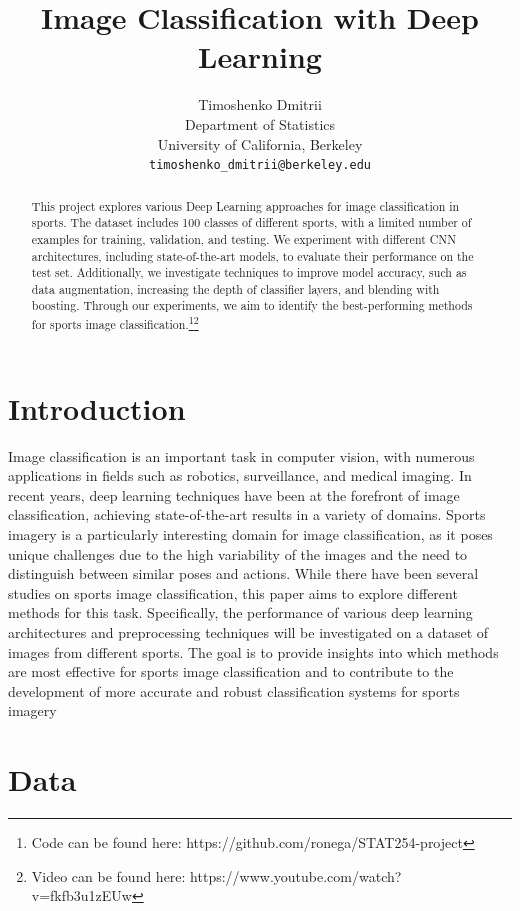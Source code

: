 \documentclass[reqno]{article}
\title{Image Classification with Deep Learning}
\author{
	Timoshenko Dmitrii\\
	Department of Statistics\\
	University of California, Berkeley\\
	\texttt{timoshenko\_dmitrii@berkeley.edu} \\
}
\begin{document}
	
	\maketitle
	
	\begin{abstract}
				This project explores various Deep Learning approaches for image classification in sports. The dataset includes 100 classes of different sports, with a limited number of examples for training, validation, and testing. We experiment with different CNN architectures, including state-of-the-art models, to evaluate their performance on the test set. Additionally, we investigate techniques to improve model accuracy, such as data augmentation, increasing the depth of classifier layers, and blending with boosting. Through our experiments, we aim to identify the best-performing methods for sports image classification.\footnote{Code can be found here: https://github.com/ronega/STAT254-project}\footnote{Video can be found here: https://www.youtube.com/watch?v=fkfb3u1zEUw}
	\end{abstract}
	
	\section{Introduction}
	Image classification is an important task in computer vision, with numerous applications in fields such as robotics, surveillance, and medical imaging. In recent years, deep learning techniques have been at the forefront of image classification, achieving state-of-the-art results in a variety of domains. Sports imagery is a particularly interesting domain for image classification, as it poses unique challenges due to the high variability of the images and the need to distinguish between similar poses and actions. While there have been several studies on sports image classification, this paper aims to explore different methods for this task. Specifically, the performance of various deep learning architectures and preprocessing techniques will be investigated on a dataset of images from different sports. The goal is to provide insights into which methods are most effective for sports image classification and to contribute to the development of more accurate and robust classification systems for sports imagery
	
	\section{Data}
	
\end{document}
